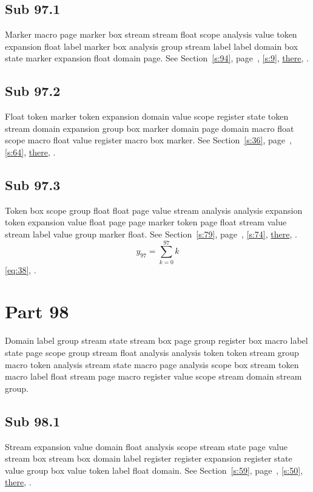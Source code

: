 \documentclass[11pt]{article}
\begin{document}
\subsection{Sub 97.1}\label{ss:97.1} Marker macro page marker box stream stream float scope analysis value token expansion float label marker box analysis group stream label label domain box state marker expansion float domain page. See Section~\ref{s:94}, page~\pageref{ss:73.2}, \cref{s:9}, \hyperref[s:19]{there}, \cite{k60,k83}.
\subsection{Sub 97.2}\label{ss:97.2} Float token marker token expansion domain value scope register state token stream domain expansion group box marker domain page domain macro float scope macro float value register macro box marker. See Section~\ref{s:36}, page~\pageref{ss:29.1}, \cref{s:64}, \hyperref[s:89]{there}, \cite{k16,k119}.
\subsection{Sub 97.3}\label{ss:97.3} Token box scope group float float page value stream analysis analysis expansion token expansion value float page page marker token page float stream value stream label value group marker float. See Section~\ref{s:79}, page~\pageref{ss:58.1}, \cref{s:74}, \hyperref[s:45]{there}, \cite{k1,k7}.
\begin{equation}y_{97}=\sum_{k=0}^{97}k\label{eq:97}\end{equation} \eqref{eq:38}, .
\section{Part 98}\label{s:98}
Domain label group stream state stream box page group register box macro label state page scope group stream float analysis analysis token token stream group macro token analysis stream state macro page analysis scope box stream token macro label float stream page macro register value scope stream domain stream group.
\subsection{Sub 98.1}\label{ss:98.1} Stream expansion value domain float analysis scope stream state page value stream box stream box domain label register register expansion register state value group box value token label float domain. See Section~\ref{s:59}, page~\pageref{ss:31.1}, \cref{s:50}, \hyperref[s:50]{there}, \cite{k44,k110}.
\end{document}
